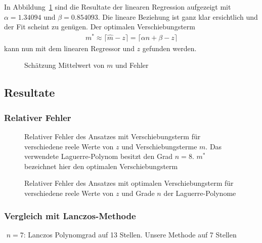 In Abbildung~\ref{laguerre:fig:schaetzung} sind die Resultate
der linearen Regression aufgezeigt mit $\alpha = 1.34094$ und $\beta =
0.854093$.
Die lineare Beziehung ist ganz klar ersichtlich und der Fit scheint zu genügen.
Der optimalen Verschiebungsterm
\begin{align*}
m^*
\approx
\lceil \hat{m} - z \rceil
=
\lceil \alpha n + \beta - z \rceil
\end{align*}
kann nun mit dem linearen Regressor und $z$ gefunden werden.

\begin{figure}
\centering

\vspace{-12pt}
\caption{Schätzung Mittelwert von $m$ und Fehler}
\label{laguerre:fig:schaetzung}
\end{figure}

\subsection{Resultate}

\subsubsection{Relativer Fehler}

\begin{figure}
\centering

\vspace{-12pt}
\caption{Relativer Fehler des Ansatzes mit Verschiebungsterm
für verschiedene reele Werte von $z$ und Verschiebungsterme $m$.
Das verwendete Laguerre-Polynom besitzt den Grad $n = 8$.
$m^*$ bezeichnet hier den optimalen Verschiebungsterm}
\label{laguerre:fig:rel_error_shifted}
\end{figure}
  
\begin{figure}
\centering

\vspace{-12pt}
\caption{Relativer Fehler des Ansatzes mit optimalen Verschiebungsterm
für verschiedene reele Werte von $z$ und Grade $n$ der Laguerre-Polynome}
\label{laguerre:fig:rel_error_range}
\end{figure}

\subsubsection{Vergleich mit Lanczos-Methode}
{\color{red}
$ $\newline
$n = 7$:\newline
Lanczos Polynomgrad auf 13 Stellen.\newline
Unsere Methode auf 7 Stellen
}

